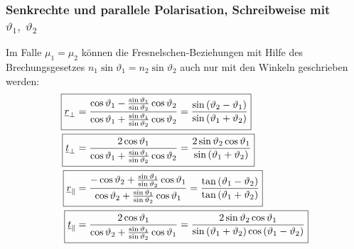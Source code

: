 	  \subsubsection{Senkrechte und parallele Polarisation, Schreibweise mit \(\vartheta_1,\;\vartheta_2\)}
			  Im Falle \(\mu_1 = \mu_2\) können die Fresnelschen-Beziehungen mit Hilfe des Brechungsgesetzes \(n_1\sin\vartheta_1=n_2\sin\vartheta_2\) auch nur mit den Winkeln geschrieben werden:
			        \begin{equation}\label{frenselvereinf}\begin{split}
					        \Aboxed{\underline{r}_\perp &= \frac{\cos\vartheta_1- \frac{\sin\vartheta_1}{\sin\vartheta_2}\cos\vartheta_2}{\cos\vartheta_1+ \frac{\sin\vartheta_1}{\sin\vartheta_2}\cos\vartheta_2} = \frac{\sin\left(\vartheta_2-\vartheta_1\right)}{\sin\left(\vartheta_1+\vartheta_2\right)}}\\
					        \Aboxed{\underline{t}_\perp &= \frac{2 \cos\vartheta_1}{\cos\vartheta_1+ \frac{\sin\vartheta_1}{\sin\vartheta_2}\cos\vartheta_2} = \frac{2\sin\vartheta_2\cos\vartheta_1}{\sin\left(\vartheta_1+\vartheta_2\right)}} \\
					        \Aboxed{\underline{r}_\parallel &= \frac{-\cos\vartheta_2+ \frac{\sin\vartheta_1}{\sin\vartheta_2}\cos\vartheta_1}{\cos\vartheta_2+ \frac{\sin\vartheta_1}{\sin\vartheta_2}\cos\vartheta_1}=\frac{\tan\left(\vartheta_1-\vartheta_2\right)}{\tan\left(\vartheta_1+\vartheta_2\right)}}\\
					        \Aboxed{\underline{t}_\parallel &= \frac{2 \cos\vartheta_1}{\cos\vartheta_2+ \frac{\sin\vartheta_1}{\sin\vartheta_2}\cos\vartheta_1}= \frac{2\sin\vartheta_2\cos\vartheta_1}{\sin\left(\vartheta_1+\vartheta_2\right) \cos\left(\vartheta_1-\vartheta_2\right)}}
				        \end{split}\end{equation}
